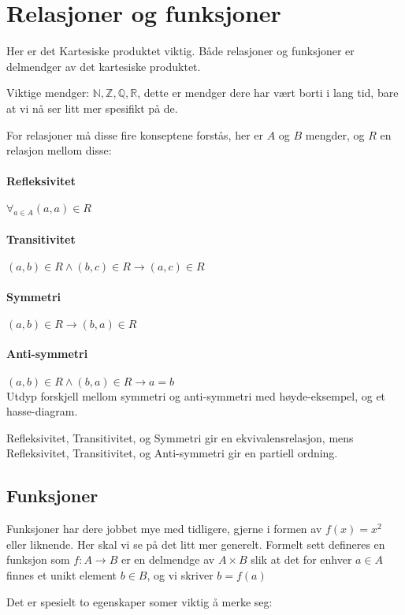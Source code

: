 \section{Relasjoner og funksjoner}

Her er det Kartesiske produktet viktig. Både relasjoner og funksjoner er delmendger av det
kartesiske produktet. 

Viktige mendger: $\mathbb{N}, \mathbb{Z}, \mathbb{Q}, \mathbb{R}$, dette er mendger dere har vært borti i lang tid, bare at vi nå ser litt mer spesifikt på de.

For relasjoner må disse fire konseptene forstås, her er $A$ og $B$ mengder, og $R$ en relasjon mellom disse:
\paragraph*{Refleksivitet} $\forall_{a\in A} (a,a)\in R$
\paragraph*{Transitivitet} $(a,b) \in R\land (b,c)\in R \to (a,c) \in R$
\paragraph*{Symmetri} $(a,b)\in R \to (b,a) \in R$
\paragraph*{Anti-symmetri} $(a,b) \in R \land (b,a)\in R \to a=b$\\

\noindent Utdyp forskjell mellom symmetri og anti-symmetri med høyde-eksempel, og et hasse-diagram.

Refleksivitet, Transitivitet, og Symmetri gir en ekvivalensrelasjon, mens Refleksivitet, Transitivitet, og Anti-symmetri gir en partiell ordning.

\subsection{Funksjoner}

Funksjoner har dere jobbet mye med tidligere, gjerne i formen av $f(x) = x^2$ eller liknende. Her skal vi se på det litt mer generelt.
Formelt sett defineres en funksjon som $f:A\to B$ er en delmendge av $A \times B$ slik at det for enhver $a\in A$
finnes et unikt element $b\in B$, og vi skriver $b=f(a)$

Det er spesielt to egenskaper somer viktig å merke seg:

